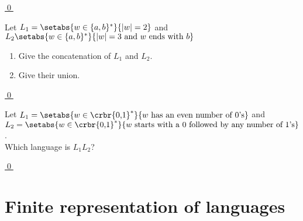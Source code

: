 \documentclass[11pt]{article}
\begin{document}
{\begin{uexercise}
\hyperlink{extf1sol}{\qed}
\end{uexercise}


\begin{uexercise}\label{exconcuni}
Let $L_1 = \setabs{w \in \{ a,b\}^*}{|w| = 2}$ and $L_2\setabs{w \in \{ a,b\}^*}{|w| = 3 \text{ and } w \text{ ends with } b}$

\begin{enumerate}
\item\label{exconcunia} Give the concatenation of $L_1$ and $L_2$.
\item\label{exconcunib} Give their union.
\end{enumerate}

\hyperlink{exconcunisol}{\qed}
\end{uexercise}



\begin{uexercise}\label{lang-desc}
Let $L_1=\setabs{w \in \crbr{\text{0,1}}^*}{w \text{ has an even number of
0's}}$ and  \\
$L_2= \setabs{w \in \crbr{\text{0,1}}^*}{w \text{ starts
with a 0 followed by any number of 1's}}$. \\ Which language is $L_1L_2$?

\hyperlink{lang-desc-sol}{\qed}
\end{uexercise}
\hrulefill

}
\newpage
\section{Finite representation of languages}
\end{document}
